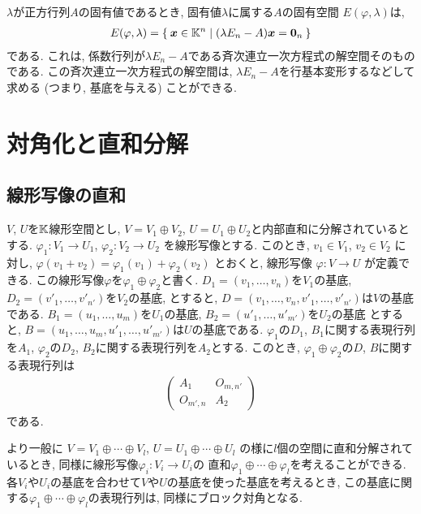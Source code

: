 $\lambda$が正方行列$A$の固有値であるとき,
固有値$\lambda$に属する$A$の固有空間
$E(\varphi,\lambda)$は,
\begin{align*}
    E(\varphi,\lambda) = \Set{\boldsymbol{x}\in\mathbb{K}^n|(\lambda E_n-A)\boldsymbol{x}=\boldsymbol{0}_n}
\end{align*}
である.
これは,
係数行列が$\lambda E_n-A$である斉次連立一次方程式の解空間そのものである.
この斉次連立一次方程式の解空間は,
$\lambda E_n-A$を行基本変形するなどして求める
(つまり, 基底を与える) ことができる.

\begin{quiz}
\end{quiz}



\chapter{対角化と直和分解}
\section{線形写像の直和}
$V$, $U$を$\mathbb{K}$線形空間とし,
$V=V_1\oplus V_2$,
$U=U_1\oplus U_2$と内部直和に分解されているとする.
$\varphi_1\colon V_1\to U_1$,
$\varphi_2\colon V_2\to U_2$
を線形写像とする.
このとき,
$v_1\in V_1$, $v_2\in V_2$
に対し,
$\varphi(v_1+v_2)=\varphi_1(v_1)+\varphi_2(v_2)$
とおくと,
線形写像
$\varphi\colon V\to U$
が定義できる.
この線形写像$\varphi$を$\varphi_1\oplus \varphi_2$と書く.
$D_1=(v_1,\ldots,v_n)$を$V_1$の基底,
$D_2=(v'_1,\ldots,v'_{n'})$を$V_2$の基底,
とすると,
$D=(v_1,\ldots,v_n,v'_1,\ldots,v'_{n'})$は$V$の基底である.
$B_1=(u_1,\ldots,u_m)$を$U_1$の基底,
$B_2=(u'_1,\ldots,u'_{m'})$を$U_2$の基底
とすると,
$B=(u_1,\ldots,u_m,u'_1,\ldots,u'_{m'})$は$U$の基底である.
$\varphi_1$の$D_1$, $B_1$に関する表現行列を$A_1$,
$\varphi_2$の$D_2$, $B_2$に関する表現行列を$A_2$とする.
このとき,
$\varphi_1\oplus \varphi_2$の$D$, $B$に関する表現行列は
\begin{align*}
  \begin{pmatrix}A_1&O_{m,n'}\\O_{m',n}&A_2\end{pmatrix}
\end{align*}
である.

より一般に
$V=V_1\oplus \cdots \oplus V_l$,
$U=U_1\oplus \cdots \oplus U_l$
の様に$l$個の空間に直和分解されているとき,
同様に線形写像$\varphi_i\colon V_i\to U_i$の
直和$\varphi_1\oplus \cdots \oplus \varphi_l$を考えることができる.
各$V_i$や$U_i$の基底を合わせて$V$や$U$の基底を使った基底を考えるとき,
この基底に関する$\varphi_1\oplus \cdots \oplus \varphi_l$の表現行列は,
同様にブロック対角となる.


